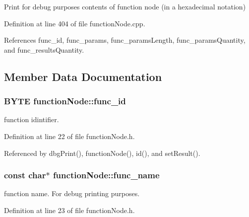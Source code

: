 Print for debug purposes contents of function node (in a hexadecimal notation) 



Definition at line 404 of file functionNode.cpp.



References func\_\-id, func\_\-params, func\_\-paramsLength, func\_\-paramsQuantity, and func\_\-resultsQuantity.



\subsection{Member Data Documentation}
\hypertarget{classfunctionNode_a57622265a83e829d3bf9398b37e64d4c}{
\subsubsection[{func\_\-id}]{\setlength{\rightskip}{0pt plus 5cm}BYTE {\bf functionNode::func\_\-id}}}
\label{d1/d20/classfunctionNode_a57622265a83e829d3bf9398b37e64d4c}


function idintifier. 



Definition at line 22 of file functionNode.h.



Referenced by dbgPrint(), functionNode(), id(), and setResult().

\hypertarget{classfunctionNode_af96291f4eb06252ac63bc303b73059ed}{
\subsubsection[{func\_\-name}]{\setlength{\rightskip}{0pt plus 5cm}const char$\ast$ {\bf functionNode::func\_\-name}}}
\label{d1/d20/classfunctionNode_af96291f4eb06252ac63bc303b73059ed}


function name. For debug printing purposes. 



Definition at line 23 of file functionNode.h.



